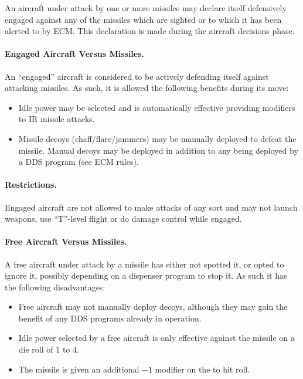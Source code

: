An aircraft under attack by one or more missiles may declare itself defensively engaged against any of the missiles which are sighted or to which it has been alerted to by ECM. This declaration is made during the aircraft decisions phase.

\paragraph{Engaged Aircraft Versus Missiles.} An “engaged” aircraft is considered to be actively defending itself against attacking missiles. As such, it is allowed the following benefits during its move:

\begin{itemize}

    \item Idle power may be selected and is automatically effective providing modifiers to IR missile attacks.

    \item Missile decoys (chaff/flare/jammers) may be manually deployed to defeat the missile. Manual decoys may be deployed in addition to any being deployed by a DDS program (see ECM rules).

    
\end{itemize}

\paragraph{Restrictions.} Engaged aircraft are not allowed to make attacks of any sort and may not launch weapons, use “T”-level flight or do damage control while engaged.

\paragraph{Free Aircraft Versus Missiles.} A free aircraft under attack by a missile has either not spotted it, or opted to ignore it, possibly depending on a dispenser program to stop it. As such it has the following disadvantages:

\begin{itemize}


    \item Free aircraft may not manually deploy decoys, although they may gain the benefit of any DDS programs already in operation.

    \item Idle power selected by a free aircraft is only effective against the missile on a die roll of 1 to 4.

    \item The missile is given an additional $-1$ modifier on the to hit roll.

\end{itemize}

